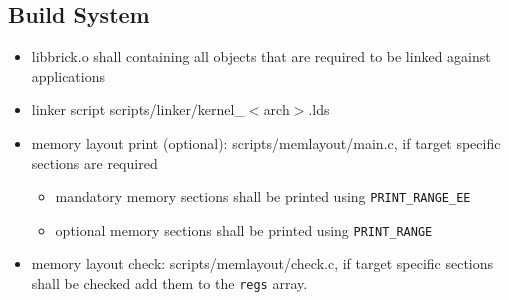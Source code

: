 	\subsection{Build System}
		\begin{itemize}
			\item libbrick.o shall containing all objects that are required to be linked against applications
			\item linker script scripts/linker/kernel\_$<$arch$>$.lds
			\item memory layout print (optional): scripts/memlayout/main.c, if target specific sections are required
				\begin{itemize}
					\item mandatory memory sections shall be printed using \lstinline{PRINT_RANGE_EE}
					\item optional memory sections shall be printed using \lstinline{PRINT_RANGE}
				\end{itemize}

			\item memory layout check: scripts/memlayout/check.c, if target specific sections shall be checked add them to the \lstinline{regs} array.
		\end{itemize}

\vfill
\pagebreak


